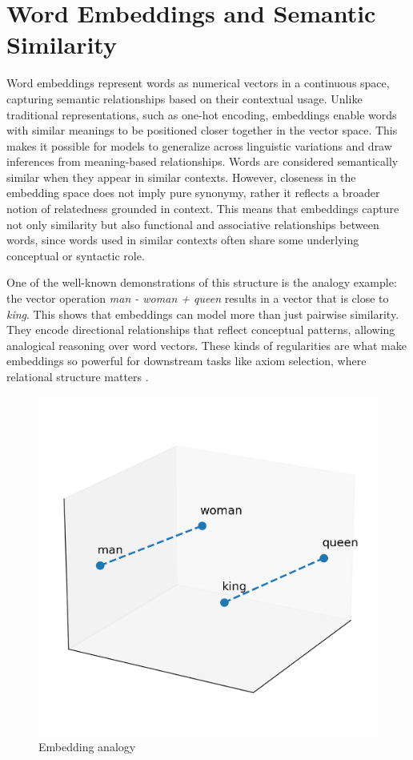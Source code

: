 \documentclass[english,version-2020-11]{uzl-thesis}
\begin{document}
\section{Word Embeddings and Semantic Similarity}

Word embeddings represent words as numerical vectors in a continuous space, capturing semantic relationships based on their contextual usage. Unlike traditional representations, such as one-hot encoding, embeddings enable words with similar meanings to be positioned closer together in the vector space. This makes it possible for models to generalize across linguistic variations and draw inferences from meaning-based relationships.
Words are considered semantically similar when they appear in similar contexts. However, closeness in the embedding space does not imply pure synonymy, rather it reflects a broader notion of relatedness grounded in context. This means that embeddings capture not only similarity but also functional and associative relationships between words, since words used in similar contexts often share some underlying conceptual or syntactic role.

One of the well-known demonstrations of this structure is the analogy example: the vector operation \textit{man - woman + queen} results in a vector that is close to \textit{king}. This shows that embeddings can model more than just pairwise similarity. They encode directional relationships that reflect conceptual patterns, allowing analogical reasoning over word vectors. These kinds of regularities are what make embeddings so powerful for downstream tasks like axiom selection, where relational structure matters \cite{Mikolov2013}.

\begin{figure}[h!]
    \centering
    \includegraphics[width=\textwidth]{embedding_analogy.png}
    \caption{Embedding analogy}
    \label{fig:embedding_analogy}
\end{figure}
\FloatBarrier
\end{document}
